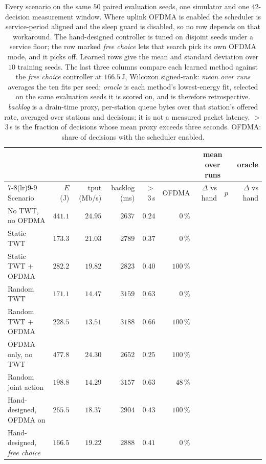 \begin{table}[t]
\centering
\caption{Every scenario on the same $50$ paired evaluation seeds, one
simulator and one $42$-decision measurement window. Where uplink OFDMA is
enabled the scheduler is service-period aligned and the sleep guard is
disabled, so no row depends on that workaround. The hand-designed controller
is tuned on disjoint seeds under a service floor; the row marked
\emph{free choice} lets that search pick its own OFDMA mode, and it picks
off. Learned rows give the mean and standard deviation over $10$ training
seeds. The last three columns compare each learned method against the
\emph{free choice} controller at $166.5$\,J, Wilcoxon signed-rank:
\emph{mean over runs} averages the ten fits per seed; \emph{oracle}
is each method's lowest-energy fit, selected on the same evaluation seeds
it is scored on, and is therefore retrospective. \emph{backlog} is a
drain-time proxy, per-station queue bytes over that station's offered
rate, averaged over stations and decisions; it is not a measured packet
latency. $>$3\,s is the fraction of decisions whose mean proxy exceeds
three seconds. OFDMA: share of decisions with the scheduler enabled.}
\label{tab:main}
\footnotesize
\setlength{\tabcolsep}{4.5pt}
\begin{tabular}{lrrrrrrrr}
\toprule
 & & & & & & \multicolumn{2}{c}{mean over runs} & oracle \\
\cmidrule(lr){7-8}\cmidrule(lr){9-9}
Scenario & $E$ (J) & tput (Mb/s) & backlog (ms) & $>$3\,s & OFDMA & $\Delta$ vs hand & $p$ & $\Delta$ vs hand \\
\midrule
No TWT, no OFDMA & $441.1$ & $24.95$ & $2637$ & $0.24$ & $0\,\%$ & & & \\
Static TWT & $173.3$ & $21.03$ & $2789$ & $0.37$ & $0\,\%$ & & & \\
Static TWT $+$ OFDMA & $282.2$ & $19.82$ & $2823$ & $0.40$ & $100\,\%$ & & & \\
Random TWT & $171.1$ & $14.47$ & $3159$ & $0.63$ & $0\,\%$ & & & \\
Random TWT $+$ OFDMA & $228.5$ & $13.51$ & $3188$ & $0.66$ & $100\,\%$ & & & \\
OFDMA only, no TWT & $477.8$ & $24.30$ & $2652$ & $0.25$ & $100\,\%$ & & & \\
Random joint action & $198.8$ & $14.29$ & $3157$ & $0.63$ & $48\,\%$ & & & \\
Hand-designed, OFDMA on & $265.5$ & $18.37$ & $2904$ & $0.43$ & $100\,\%$ & & & \\
Hand-designed, \emph{free choice} & $166.5$ & $19.22$ & $2888$ & $0.41$ & $0\,\%$ & & & \\

\end{tabular}
\end{table}
